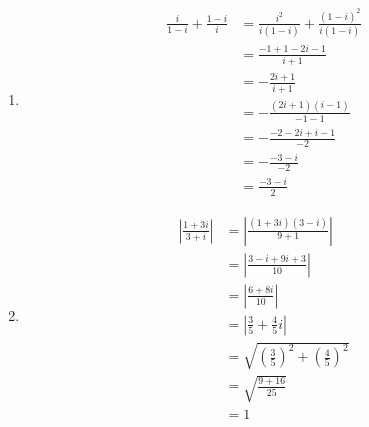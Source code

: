 \documentclass[fleqn, a4paper, 11pt, oneside]{amsart}
\theoremstyle{definition}
\theoremstyle{theorem}
\begin{document}
\begin{solution}
	\begin{enumerate}[leftmargin=*]
		\item
			\begin{align*}
				\frac{i}{1 - i} + \frac{1 - i}{i} & = \frac{i^2}{i (1 - i)} + \frac{(1 - i)^2}{i (1 - i)} \\
                                                                  & = \frac{-1 + 1 - 2 i - 1}{i + 1}                      \\
                                                                  & = -\frac{2 i + 1}{i + 1}                              \\
                                                                  & = -\frac{(2 i + 1) (i - 1)}{-1 - 1}                   \\
                                                                  & = -\frac{-2 - 2 i + i - 1}{-2}                        \\
                                                                  & = -\frac{-3 - i}{-2}                                  \\
                                                                  & = \frac{-3 - i}{2}
			\end{align*}
		\item
			\begin{align*}
				\left| \frac{1 + 3 i}{3 + i} \right| & = \left| \frac{(1 + 3 i) (3 - i)}{9 + 1} \right|                     \\
                                                                     & = \left| \frac{3 - i + 9 i + 3}{10} \right|                          \\
                                                                     & = \left| \frac{6 + 8 i}{10} \right|                                  \\
                                                                     & = \left| \frac{3}{5} + \frac{4}{5} i \right|                         \\
                                                                     & = \sqrt{\left( \frac{3}{5} \right)^2 + \left( \frac{4}{5} \right)^2} \\
                                                                     & = \sqrt{\frac{9 + 16}{25}}                                           \\
                                                                     & = 1
			\end{align*}
	\end{enumerate}
\end{solution}
\end{document}
